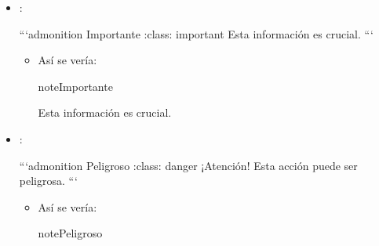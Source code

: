 \documentclass[a4paper,10pt,oneside,spanish,openany]{sphinxmanual}
\begin{document}
\begin{itemize}
\begin{sphinxVerbatim}[commandchars=\\\{\}]
  ```\PYGZob{}admonition\PYGZcb{} Consejo :class: tip Aquí tienes un consejo útil. ```
\end{sphinxVerbatim}
\begin{itemize}
\item {} 
\sphinxAtStartPar
Así se vería:

\begin{sphinxadmonition}{note}{Consejo}

\sphinxAtStartPar
Aquí tienes un consejo útil.
\end{sphinxadmonition}

\end{itemize}

\item {} 
\sphinxAtStartPar
{}:

\begin{sphinxVerbatim}[commandchars=\\\{\}]
  ```\PYGZob{}admonition\PYGZcb{} Importante :class: important Esta información es crucial. ```
\end{sphinxVerbatim}
\begin{itemize}
\item {} 
\sphinxAtStartPar
Así se vería:

\begin{sphinxadmonition}{note}{Importante}

\sphinxAtStartPar
Esta información es crucial.
\end{sphinxadmonition}

\end{itemize}

\item {} 
\sphinxAtStartPar
{}:

\begin{sphinxVerbatim}[commandchars=\\\{\}]
  ```\PYGZob{}admonition\PYGZcb{} Peligroso :class: danger ¡Atención! Esta acción puede ser peligrosa. ```
\end{sphinxVerbatim}
\begin{itemize}
\item {} 
\sphinxAtStartPar
Así se vería:

\begin{sphinxadmonition}{note}{Peligroso}


\end{sphinxadmonition}
\end{itemize}
\end{itemize}
\end{document}
